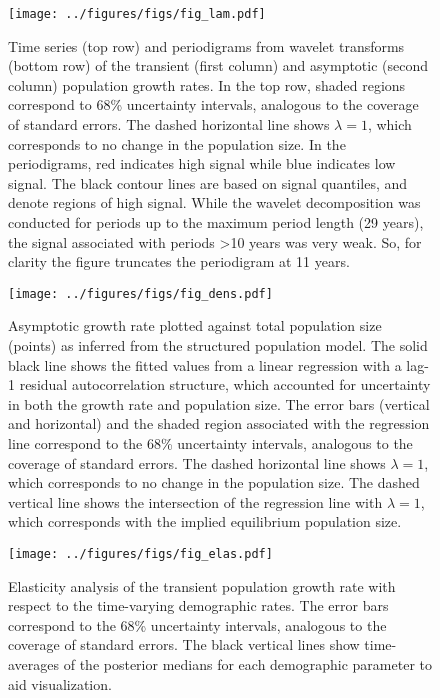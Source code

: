 \documentclass[11pt]{article}
\begin{document}
\clearpage
\begin{figure}
\centering
\texttt{[image: ../figures/figs/fig\_lam.pdf]}
\caption{\label{fig:lam}
Time series (top row) and periodigrams from wavelet transforms (bottom row) 
of the transient (first column) and asymptotic (second column) population growth rates.
In the top row, shaded regions correspond to 68\% uncertainty intervals,
analogous to the coverage of standard errors.
The dashed horizontal line shows $\lambda=1$, 
which corresponds to no change in the population size.
In the periodigrams, red indicates high signal while blue indicates low signal. 
The black contour lines are based on signal quantiles, and denote regions of high signal.
While the wavelet decomposition was conducted for periods up to the maximum period length
(29 years), the signal associated with periods >10 years was very weak. 
So, for clarity the figure truncates the periodigram at 11 years.
}
\end{figure}
\clearpage

\clearpage
\begin{figure}
\centering
\texttt{[image: ../figures/figs/fig\_dens.pdf]}
\caption{\label{fig:dens}
Asymptotic growth rate plotted against total population size (points) as 
inferred from the structured population model.
The solid black line shows the fitted values from a linear regression with a lag-1
residual autocorrelation structure, 
which accounted for uncertainty in both the growth rate and population size.
The error bars (vertical and horizontal)
and the shaded region associated with the regression line 
correspond to the 68\% uncertainty intervals,
analogous to the coverage of standard errors.
The dashed horizontal line shows $\lambda=1$, 
which corresponds to no change in the population size.
The dashed vertical line shows the intersection of the regression line with $\lambda=1$,
which corresponds with the implied equilibrium population size.
}
\end{figure}
\clearpage

\clearpage
\begin{figure}
\centering
\texttt{[image: ../figures/figs/fig\_elas.pdf]}
\caption{\label{fig:elas}
Elasticity analysis of the transient population growth rate 
with respect to the time-varying demographic rates.
The error bars correspond to the 68\% uncertainty intervals,
analogous to the coverage of standard errors.
The black vertical lines show time-averages of the posterior medians 
for each demographic parameter to aid visualization.
}
\end{figure}
\clearpage
\end{document}
